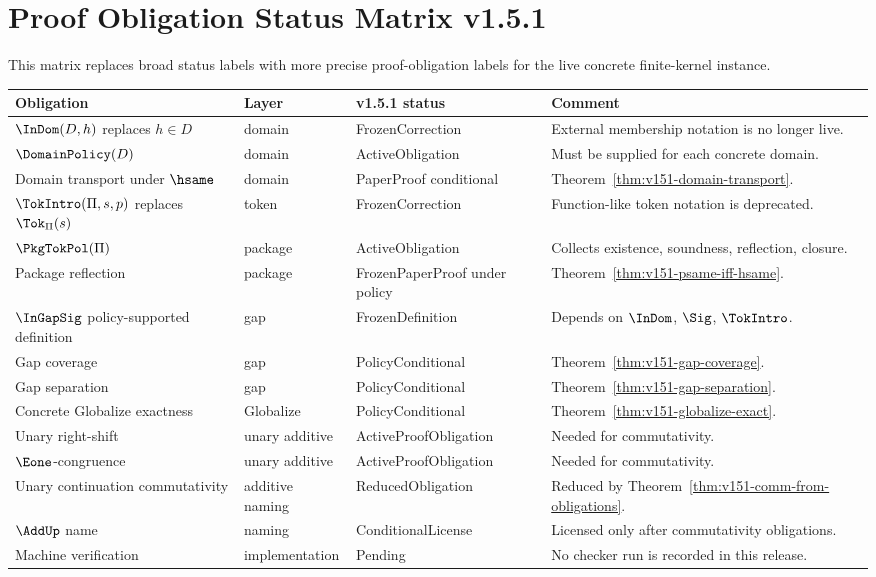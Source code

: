 \chapter{Proof Obligation Status Matrix v1.5.1}
\label{ch:v151-status}

This matrix replaces broad status labels with more precise proof-obligation labels for the live concrete finite-kernel instance.

\begin{longtable}{p{}p{}p{}p{}}
\toprule
\textbf{Obligation} & \textbf{Layer} & \textbf{v1.5.1 status} & \textbf{Comment}\\
\midrule
\(\InDom(D,h)\) replaces \(h\in D\) & domain & FrozenCorrection & External membership notation is no longer live.\\
\(\DomainPolicy(D)\) & domain & ActiveObligation & Must be supplied for each concrete domain.\\
Domain transport under \(\hsame\) & domain & PaperProof conditional & Theorem~\ref{thm:v151-domain-transport}.\\
\(\TokIntro(\Pi,s,p)\) replaces \(\Tok_{\Pi}(s)\) & token & FrozenCorrection & Function-like token notation is deprecated.\\
\(\PkgTokPol(\Pi)\) & package & ActiveObligation & Collects existence, soundness, reflection, closure.\\
Package reflection & package & FrozenPaperProof under policy & Theorem~\ref{thm:v151-psame-iff-hsame}.\\
\(\InGapSig\) policy-supported definition & gap & FrozenDefinition & Depends on \(\InDom\), \(\Sig\), \(\TokIntro\).\\
Gap coverage & gap & PolicyConditional & Theorem~\ref{thm:v151-gap-coverage}.\\
Gap separation & gap & PolicyConditional & Theorem~\ref{thm:v151-gap-separation}.\\
Concrete Globalize exactness & Globalize & PolicyConditional & Theorem~\ref{thm:v151-globalize-exact}.\\
Unary right-shift & unary additive & ActiveProofObligation & Needed for commutativity.\\
\(\Eone\)-congruence & unary additive & ActiveProofObligation & Needed for commutativity.\\
Unary continuation commutativity & additive naming & ReducedObligation & Reduced by Theorem~\ref{thm:v151-comm-from-obligations}.\\
\(\AddUp\) name & naming & ConditionalLicense & Licensed only after commutativity obligations.\\
Machine verification & implementation & Pending & No checker run is recorded in this release.\\
\bottomrule
\end{longtable}
